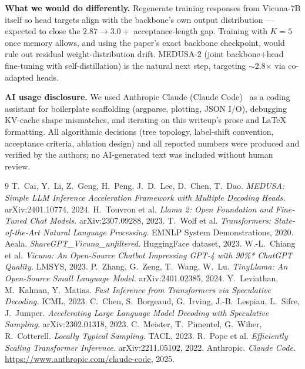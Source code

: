 \documentclass[11pt,letterpaper]{article}
\begin{document}
\textbf{What we would do differently.} Regenerate training responses from Vicuna-7B itself so head targets align with the backbone's own output distribution --- expected to close the $2.87 \to 3.0{+}$ acceptance-length gap. Training with $K{=}5$ once memory allows, and using the paper's exact backbone checkpoint, would rule out residual weight-distribution drift. MEDUSA-2 (joint backbone+head fine-tuning with self-distillation) is the natural next step, targeting $\sim$2.8$\times$ via co-adapted heads.

\textbf{AI usage disclosure.} We used Anthropic Claude (Claude Code)~\cite{claudecode} as a coding assistant for boilerplate scaffolding (argparse, plotting, JSON I/O), debugging KV-cache shape mismatches, and iterating on this writeup's prose and \LaTeX{} formatting. All algorithmic decisions (tree topology, label-shift convention, acceptance criteria, ablation design) and all reported numbers were produced and verified by the authors; no AI-generated text was included without human review.

\begin{thebibliography}{9}
\small
\setlength{\itemsep}{0pt}
 T.~Cai, Y.~Li, Z.~Geng, H.~Peng, J.~D.~Lee, D.~Chen, T.~Dao. \emph{MEDUSA: Simple LLM Inference Acceleration Framework with Multiple Decoding Heads.} arXiv:2401.10774, 2024.
 H.~Touvron et al. \emph{Llama 2: Open Foundation and Fine-Tuned Chat Models.} arXiv:2307.09288, 2023.
 T.~Wolf et al. \emph{Transformers: State-of-the-Art Natural Language Processing.} EMNLP System Demonstrations, 2020.
 Aeala. \emph{ShareGPT\_Vicuna\_unfiltered.} HuggingFace dataset, 2023.
 W.-L.~Chiang et al. \emph{Vicuna: An Open-Source Chatbot Impressing GPT-4 with 90\%* ChatGPT Quality.} LMSYS, 2023.
 P.~Zhang, G.~Zeng, T.~Wang, W.~Lu. \emph{TinyLlama: An Open-Source Small Language Model.} arXiv:2401.02385, 2024.
 Y.~Leviathan, M.~Kalman, Y.~Matias. \emph{Fast Inference from Transformers via Speculative Decoding.} ICML, 2023.
 C.~Chen, S.~Borgeaud, G.~Irving, J.-B.~Lespiau, L.~Sifre, J.~Jumper. \emph{Accelerating Large Language Model Decoding with Speculative Sampling.} arXiv:2302.01318, 2023.
 C.~Meister, T.~Pimentel, G.~Wiher, R.~Cotterell. \emph{Locally Typical Sampling.} TACL, 2023.
 R.~Pope et al. \emph{Efficiently Scaling Transformer Inference.} arXiv:2211.05102, 2022.
 Anthropic. \emph{Claude Code.} \url{https://www.anthropic.com/claude-code}, 2025.
\end{thebibliography}
\end{document}
